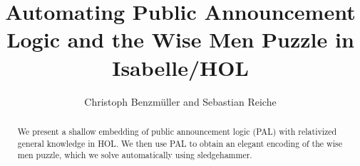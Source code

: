 \documentclass[11pt,a4paper]{article}
\begin{document}
\title{Automating Public Announcement Logic and the Wise Men Puzzle in
Isabelle/HOL}
\author{Christoph Benzm\"uller and Sebastian Reiche}
\maketitle

\begin{abstract}
We present a shallow embedding of public announcement logic (PAL) with relativized general knowledge in HOL. We then use PAL to obtain an elegant encoding of the wise men puzzle, which we solve automatically using sledgehammer.
\end{abstract}

\tableofcontents






\end{document}
